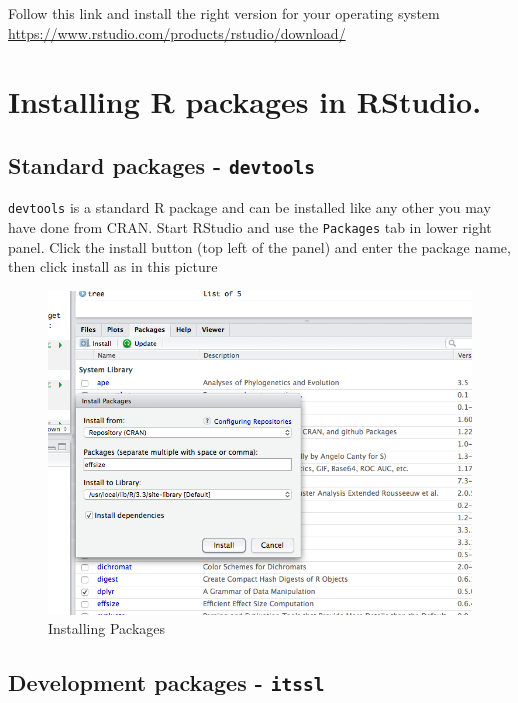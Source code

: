 \documentclass[
]{book}
\begin{document}
Follow this link and install the right version for your operating system \url{https://www.rstudio.com/products/rstudio/download/}

\hypertarget{installing-r-packages-in-rstudio.}{%
\section{Installing R packages in RStudio.}\label{installing-r-packages-in-rstudio.}}

\hypertarget{standard-packages---devtools}{%
\subsection{\texorpdfstring{Standard packages - \texttt{devtools}}{Standard packages - devtools}}\label{standard-packages---devtools}}

\texttt{devtools} is a standard R package and can be installed like any other you may have done from CRAN. Start RStudio and use the \texttt{Packages} tab in lower right panel. Click the install button (top left of the panel) and enter the package name, then click install as in this picture

\begin{figure}
\centering
\includegraphics{fig/package_install.png}
\caption{Installing Packages}
\end{figure}

\hypertarget{development-packages---itssl}{%
\subsection{\texorpdfstring{Development packages - \texttt{itssl}}{Development packages - itssl}}\label{development-packages---itssl}}
\end{document}
